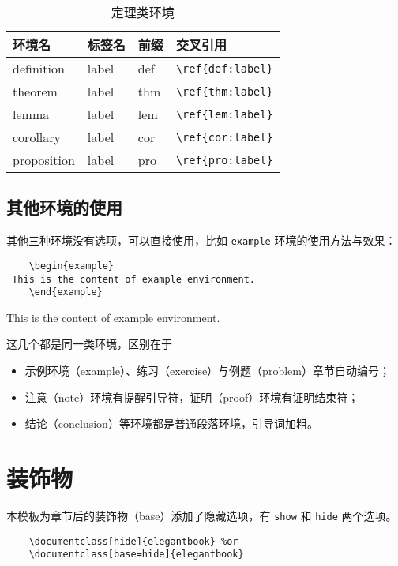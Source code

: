 	\begin{table}[htbp]
 \centering
 \caption{定理类环境}
   \begin{tabular}{llll}
   \toprule
   环境名 & 标签名 & 前缀 & 交叉引用 \\
   \midrule
   definition & label & def   & \lstinline|\ref{def:label}| \\
   theorem & label & thm   & \lstinline|\ref{thm:label}| \\
   lemma & label & lem   & \lstinline|\ref{lem:label}| \\
   corollary & label & cor   & \lstinline|\ref{cor:label}| \\
   proposition & label & pro   & \lstinline|\ref{pro:label}| \\
   \bottomrule
   \end{tabular}%
 \label{tab:theorem-class}%
 \end{table}%
 
	
	\subsection{其他环境的使用}
	其他三种环境没有选项，可以直接使用，比如 \lstinline{example} 环境的使用方法与效果：
	\begin{lstlisting}
	\begin{example}
 This is the content of example environment.
	\end{example}
	\end{lstlisting}
	
	\begin{example}
	This is the content of example environment.
	\end{example}
	
	
	这几个都是同一类环境，区别在于
	
	\begin{itemize}
 \item 示例环境（example）、练习（exercise）与例题（problem）章节自动编号；
 \item 注意（note）环境有提醒引导符，证明（proof）环境有证明结束符；
 \item 结论（conclusion）等环境都是普通段落环境，引导词加粗。
	\end{itemize}
	
	\section{装饰物}
	
	本模板为章节后的装饰物（base）添加了隐藏选项，有 \lstinline{show} 和 \lstinline{hide} 两个选项。
	\begin{lstlisting}
	\documentclass[hide]{elegantbook} %or
	\documentclass[base=hide]{elegantbook}
	\end{lstlisting}
	
